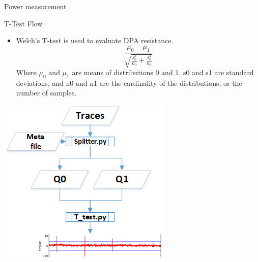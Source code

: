 \documentclass[xcolor=pdftex,dvipsnames,table,final]{beamer}
\begin{document}
\begin{frame}[fragile]{}
\begin{columns}[t]
\begin{column}{.31\linewidth}
\begin{block}{Power measurement}
      \end{block}
      \begin{block}{T-Test Flow}
         \vspace{-1ex}
         \begin{itemize}
      \item Welch's T-test is used to evaluate DPA resistance.
      $$ \frac{\mu_0 - \mu_1}{\sqrt{\frac{s_0^2}{n_0}+ \frac{s_0^2}{n_0}}}$$
      {\small
          Where $\mu_0$ and $\mu_1$ are means of distributions 0 and 1, s0 and s1 are standard deviations, and n0 and n1 are the cardinality of the distributions, or the number of samples.
          }
         \end{itemize}
        \begin{center}
     \includegraphics[scale=1.0]{images/t_test_flow.png}
        \end{center} 
         

\end{block}
\end{column}
\end{columns}
\end{frame}
\end{document}
